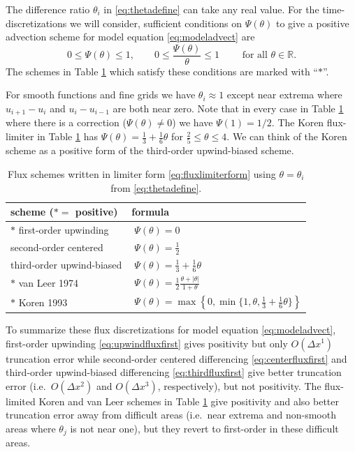 \documentclass[11pt,final]{amsart}
\newcommand\RR{\mathbb{R}}
\begin{document}
The difference ratio $\theta_i$ in \eqref{eq:thetadefine} can take any real value.  For the time-discretizations we will consider, sufficient conditions on $\Psi(\theta)$ to give a positive advection scheme for model equation \eqref{eq:modeladvect} are
\begin{equation}
0 \le \Psi(\theta) \le 1, \qquad 0 \le \frac{\Psi(\theta)}{\theta} \le 1 \qquad \text{ for all } \theta \in \RR.
\end{equation}
The schemes in Table \ref{tab:fluxlimiters} which satisfy these conditions are marked with ``$\ast$''.

For smooth functions and fine grids we have $\theta_i\approx 1$ except near extrema where $u_{i+1} - u_i$ and $u_i - u_{i-1}$ are both near zero.  Note that in every case in Table \ref{tab:fluxlimiters} where there is a correction ($\Psi(\theta)\ne 0$) we have $\Psi(1)=1/2$.  The Koren flux-limiter in Table \ref{tab:fluxlimiters} \citep{HundsdorferVerwer2010} has $\Psi(\theta) = \frac{1}{3}+\frac{1}{6} \theta$ for $\frac{2}{5} \le \theta \le 4$.  We can think of the Koren scheme as a positive form of the third-order upwind-biased scheme.

\begin{table}[ht]
  \centering
  \caption{Flux schemes written in limiter form \eqref{eq:fluxlimiterform} using $\theta=\theta_i$ from \eqref{eq:thetadefine}.}
  \begin{tabular}{ll}
    \textbf{scheme ($\ast=$ positive)} & \textbf{formula} \\
\hline
    $\ast$ first-order upwinding               & $\phantom{\Big|}\Psi(\theta) = 0$ \\
    \phantom{$\ast$} second-order centered     & $\phantom{\Big|}\Psi(\theta) = \frac{1}{2}$  \\
    \phantom{$\ast$} third-order upwind-biased & $\phantom{\Big|}\Psi(\theta) = \frac{1}{3}+\frac{1}{6} \theta$  \\
    $\ast$ van Leer 1974                       & $\phantom{\Big|}\Psi(\theta) = \frac{1}{2} \frac{\theta + |\theta|}{1+\theta}$  \\
    $\ast$ Koren 1993                          & $\phantom{\Big|}\Psi(\theta) = \max\left\{0,\min\{1,\theta,\frac{1}{3}+\frac{1}{6} \theta\}\right\}$  \\
    \hline
  \end{tabular}
 \label{tab:fluxlimiters}
\end{table}

To summarize these flux discretizations for model equation \eqref{eq:modeladvect}, first-order upwinding \eqref{eq:upwindfluxfirst} gives positivity but only $O(\Delta x^1)$ truncation error while second-order centered differencing \eqref{eq:centerfluxfirst} and third-order upwind-biased differencing \eqref{eq:thirdfluxfirst} give better truncation error (i.e.~$O(\Delta x^2)$ and $O(\Delta x^3)$, respectively), but not positivity.  The flux-limited Koren and van Leer schemes in Table \ref{tab:fluxlimiters} give positivity and also better truncation error away from difficult areas (i.e.~near extrema and non-smooth areas where $\theta_j$ is not near one), but they revert to first-order in these difficult areas.
\end{document}
